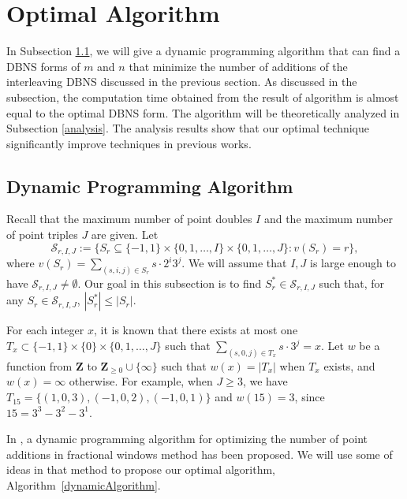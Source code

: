 \section{Optimal Algorithm}

In Subsection \ref{dynamic}, we will give a dynamic programming algorithm that can find a DBNS forms of $m$ and $n$ that minimize the number of additions of the interleaving DBNS discussed in the previous section. As discussed in the subsection, the computation time obtained from the result of algorithm is almost equal to the optimal DBNS form. The algorithm will be theoretically analyzed in Subsection \ref{analysis}. The analysis results show that our optimal technique significantly improve techniques in previous works.

\subsection{Dynamic Programming Algorithm}
\label{dynamic}

Recall that the maximum number of point doubles $I$ and the maximum number of point triples $J$ are given. Let 
$$\mathcal{S}_{r, I, J} := \{S_r \subseteq \{-1,1\} \times \{0, 1, \dots, I\} \times \{0, 1, \dots, J\} : v(S_r) = r\},$$
where $v(S_r) = \sum\limits_{(s,i,j) \in S_r} s\cdot 2^i 3^j$. We will assume that $I,J$ is large enough to have $\mathcal{S}_{r,I,J} \neq \emptyset$.
Our goal in this subsection is to find $S_r^* \in \mathcal{S}_{r, I, J}$ such that, for any $S_r \in \mathcal{S}_{r, I, J}$, $\left| S_r^* \right| \leq \left| S_r \right|$. 

For each integer $x$, it is known that there exists at most one $T_x \subset \{-1,1\} \times \{0\} \times \{0, 1, \dots, J\}$ such that $\sum\limits_{(s,0,j) \in T_x} s \cdot 3^j = x$. Let $w$ be a function from $\mathbf{Z}$ to $\mathbf{Z}_{\geq 0} \cup \{\infty\}$ such that $w(x) = |T_x|$ when $T_x$ exists, and $w(x) = \infty$ otherwise. 
For example, when $J \geq 3$, we have $T_{15} = \{(1, 0, 3), (-1, 0, 2), (-1, 0, 1)\}$ and $w(15) = 3$, since $15 = 3^3 - 3^2 - 3^1$. 

In \cite{analysisMethod}, a dynamic programming algorithm for optimizing the number of point additions in fractional windows method has been proposed. We will use some of ideas in that method to propose our optimal algorithm, Algorithm~\ref{dynamicAlgorithm}. 

